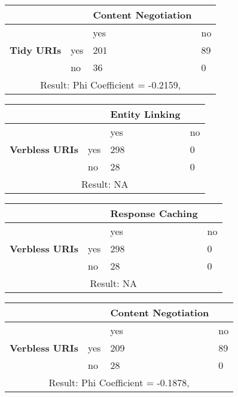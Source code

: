 \documentclass[a4paper,12pt]{article}
\begin{document}
\begin{center}
  \begin{tabular}{| p{60mm} | p{10mm} | p{35mm} | p{35mm} |}
  \hline
   & & \textbf{Content Negotiation} &
  \\
  \hline
  & & yes & no
  \\
  \hline
  \textbf{Tidy URIs} & yes & 201 & 89
  \\
  \hline
   & no & 36 & 0
  \\
  \hline
  \multicolumn{4}{|c|}{Result: Phi Coefficient = -0.2159, }
  \\ \hline
  \end{tabular}
  \end{center}

\begin{center}
  \begin{tabular}{| p{60mm} | p{10mm} | p{35mm} | p{35mm} |}
  \hline
   & & \textbf{Entity Linking} &
  \\
  \hline
  & & yes & no
  \\
  \hline
  \textbf{Verbless URIs} & yes & 298 & 0
  \\
  \hline
   & no & 28 & 0
  \\
  \hline
  \multicolumn{4}{|c|}{Result: NA}
  \\ \hline
  \end{tabular}
  \end{center}

\begin{center}
  \begin{tabular}{| p{60mm} | p{10mm} | p{35mm} | p{35mm} |}
  \hline
   & & \textbf{Response Caching} &
  \\
  \hline
  & & yes & no
  \\
  \hline
  \textbf{Verbless URIs} & yes & 298 & 0
  \\
  \hline
   & no & 28 & 0
  \\
  \hline
  \multicolumn{4}{|c|}{Result: NA}
  \\ \hline
  \end{tabular}
  \end{center}

\begin{center}
  \begin{tabular}{| p{60mm} | p{10mm} | p{35mm} | p{35mm} |}
  \hline
   & & \textbf{Content Negotiation} &
  \\
  \hline
  & & yes & no
  \\
  \hline
  \textbf{Verbless URIs} & yes & 209 & 89
  \\
  \hline
   & no & 28 & 0
  \\
  \hline
  \multicolumn{4}{|c|}{Result: Phi Coefficient = -0.1878, }
  \\ \hline
  \end{tabular}
  \end{center}
\end{document}
